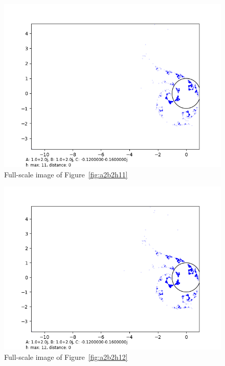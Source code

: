 \documentclass[12pt,a4paper,reqno,parskip=full]{amsart}
\numberwithin{equation}{section}
\theoremstyle{plain}
\theoremstyle{definition}
\begin{document}
\begin{figure}[H]
    \centering
    \includegraphics[width=\textwidth]{images/a2b2/a2,b2,h11,d0.png}
    \caption{Full-scale image of Figure~\ref{fig:a2b2h11}}
\end{figure}

\begin{figure}[H]
    \centering
    \includegraphics[width=\textwidth]{images/a2b2/a2,b2,h12,d0.png}
    \caption{Full-scale image of Figure~\ref{fig:a2b2h12}}
\end{figure}
\end{document}

